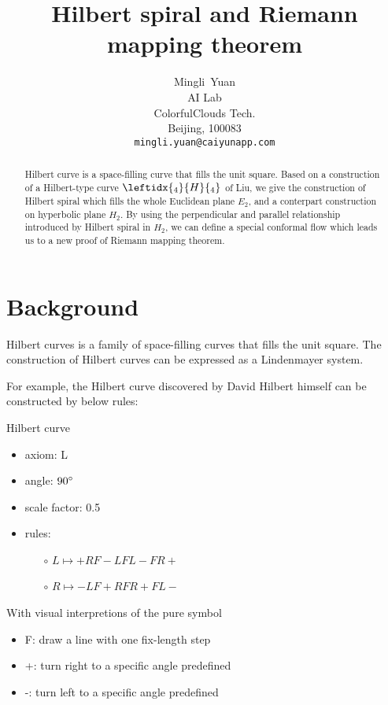\documentclass{article}
\title{Hilbert spiral and Riemann mapping theorem}
\author{
  Mingli~Yuan \\
  AI Lab \\
  ColorfulClouds Tech.\\
  Beijing, 100083 \\
  \texttt{mingli.yuan@caiyunapp.com} \\
}
\begin{document}
\maketitle

\begin{abstract}
    Hilbert curve is a space-filling curve that fills the unit square.
    Based on a construction of a Hilbert-type curve $\leftidx{_4}{H}{_4}$ of Liu,
    we give the construction of Hilbert spiral which fills the whole Euclidean plane $E_2$,
    and a conterpart construction on hyperbolic plane $H_2$.
    By using the perpendicular and parallel relationship introduced by Hilbert spiral in $H_2$,
    we can define a special conformal flow which leads us to a new proof of Riemann mapping theorem.
\end{abstract}


\setcounter{tocdepth}{2}
\tableofcontents

\section{Background}\label{sec:background}

Hilbert curves is a family of space-filling curves that fills the unit square. The construction of Hilbert curves can be
expressed as a Lindenmayer system.

For example, the Hilbert curve discovered by David Hilbert himself can be constructed by below rules:

\begin{lsystem}
    \caption{Hilbert curve}
    \begin{itemize}
      \item axiom: L
      \item angle: $90\degree$
      \item scale factor: 0.5
      \item rules: \begin{itemize}
          \item[$\circ$] $L \mapsto +RF-LFL-FR+ $
          \item[$\circ$] $R \mapsto -LF+RFR+FL- $
      \end{itemize}
    \end{itemize}
\end{lsystem}

With visual interpretions of the pure symbol
\begin{itemize}
  \item F: draw a line with one fix-length step
  \item +: turn right to a specific angle predefined
  \item -: turn left to a specific angle predefined
\end{itemize}
\end{document}
